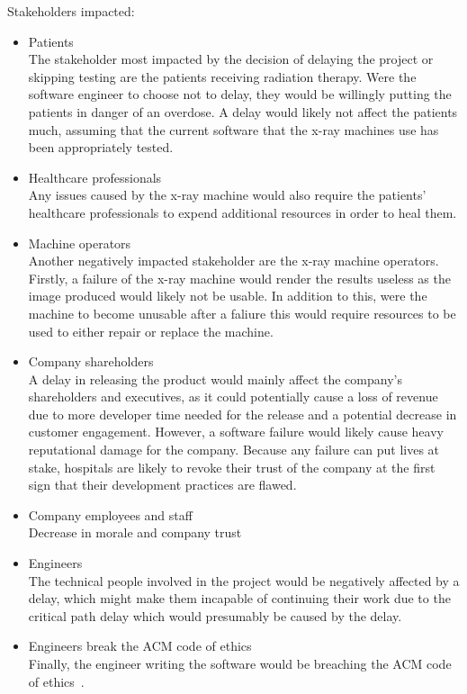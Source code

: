 \documentclass[12pt]{article}
\begin{document}
Stakeholders impacted: \begin{itemize}

    \item Patients\\
    The stakeholder most impacted by the decision of delaying the project or skipping testing are the patients receiving radiation therapy. Were the software engineer to choose not to delay, they would be willingly putting the patients in danger of an overdose. A delay would likely not affect the patients much, assuming that the current software that the x-ray machines use has been appropriately tested.

    \item Healthcare professionals\\
    Any issues caused by the x-ray machine would also require the patients' healthcare professionals to expend additional resources in order to heal them.

    \item Machine operators\\
    Another negatively impacted stakeholder are the x-ray machine operators. Firstly, a failure of the x-ray machine would render the results useless as the image produced would likely not be usable. In addition to this, were the machine to become unusable after a faliure this would require resources to be used to either repair or replace the machine.

    \item Company shareholders\\
    A delay in releasing the product would mainly affect the company's shareholders and executives, as it could potentially cause a loss of revenue due to more developer time needed for the release and a potential decrease in customer engagement. However, a software failure would likely cause heavy reputational damage for the company. Because any failure can put lives at stake, hospitals are likely to revoke their trust of the company at the first sign that their development practices are flawed.

    \item Company employees and staff\\
    Decrease in morale and company trust

    \item Engineers\\
    The technical people involved in the project would be negatively affected by a delay, which might make them incapable of continuing their work due to the critical path delay which would presumably be caused by the delay.

    \item Engineers break the ACM code of ethics\\
    Finally, the engineer writing the software would be breaching the ACM code of ethics~\cite{acm-ethics}.

\end{itemize}
\end{document}
